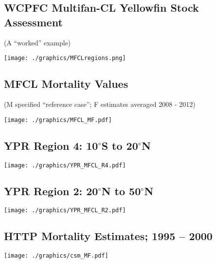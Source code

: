 \documentclass[a4paper,KOMA,landscape,titlepage]{powersem}
\renewcommand\deg[1]{$^\circ$#1}
\begin{document}
\begin{slide}\section{WCPFC Multifan-CL Yellowfin Stock Assessment}
\begin{center}
{\color{section3}\small (A ``worked'' example)}\par
\texttt{[image: ./graphics/MFCLregions.png]}
\end{center}
\end{slide}

\begin{slide}\section{MFCL Mortality Values}
\begin{center}
{\color{section3}\small (M specified ``reference case''; F estimates averaged 2008 - 2012)}\par
\texttt{[image: ./graphics/MFCL\_MF.pdf]}
\end{center}
\end{slide}

\begin{slide}\section{YPR Region 4: 10\deg{S} to 20\deg{N}}
\begin{center}
\texttt{[image: ./graphics/YPR\_MFCL\_R4.pdf]}
\end{center}
\end{slide}

\begin{slide}\section{YPR Region 2: 20\deg{N} to 50\deg{N}}
\begin{center}
\texttt{[image: ./graphics/YPR\_MFCL\_R2.pdf]}
\end{center}
\end{slide}

\begin{slide}\section{HTTP Mortality Estimates; 1995 -- 2000}
\begin{center}
\texttt{[image: ./graphics/csm\_MF.pdf]}
\end{center}
\end{slide}
\end{document}
